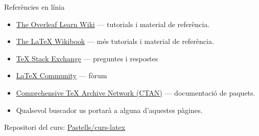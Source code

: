 \begin{frame}{Referències en línia}
\begin{itemize}
\item \href{https://www.overleaf.com/learn}{The Overleaf Learn Wiki} --- tutorials i material de referència.
\item \href{http://en.wikibooks.org/wiki/LaTeX}{The \LaTeX{} Wikibook} --- més tutorials i material de referència.
\item \href{http://tex.stackexchange.com/}{\TeX{} Stack Exchange} --- preguntes i respostes
\item \href{http://www.latex-community.org/}{\LaTeX{} Community} --- fòrum
\item \href{http://ctan.org/}{Comprehensive \TeX{} Archive Network (CTAN)} --- documentació de paquets.
\item Qualsevol buscador us portarà a alguna d'aquestes pàgines.
\end{itemize}

Repositori del curs: \href{https://github.com/Pastells/curs-latex}{Pastells/curs-latex}

\end{frame}


